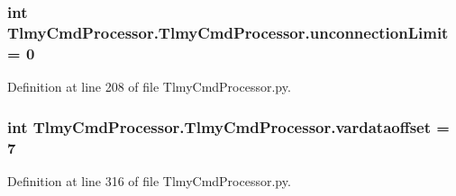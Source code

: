 \subsubsection[{unconnection\+Limit}]{\setlength{\rightskip}{0pt plus 5cm}int Tlmy\+Cmd\+Processor.\+Tlmy\+Cmd\+Processor.\+unconnection\+Limit = 0}\label{namespace_tlmy_cmd_processor_1_1_tlmy_cmd_processor_a6cdf230e4055a51015bd349429c112f7}


Definition at line 208 of file Tlmy\+Cmd\+Processor.\+py.

\hypertarget{namespace_tlmy_cmd_processor_1_1_tlmy_cmd_processor_aeebc7e9fadc6ab403d26956b6135ef62}{}
\subsubsection[{vardataoffset}]{\setlength{\rightskip}{0pt plus 5cm}int Tlmy\+Cmd\+Processor.\+Tlmy\+Cmd\+Processor.\+vardataoffset = 7}\label{namespace_tlmy_cmd_processor_1_1_tlmy_cmd_processor_aeebc7e9fadc6ab403d26956b6135ef62}


Definition at line 316 of file Tlmy\+Cmd\+Processor.\+py.

